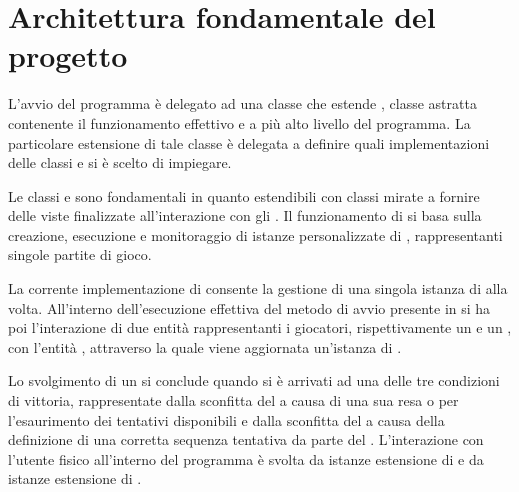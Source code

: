\documentclass[letterpaper,10pt,italian,openany,oneside]{sphinxmanual}
\begin{document}
\section{Architettura fondamentale del progetto}
\label{\detokenize{introduzione:architettura-fondamentale-del-progetto}}
L’avvio del programma è delegato ad una classe che estende , classe astratta contenente il funzionamento effettivo e a più alto livello del programma.
La particolare estensione di tale classe è delegata a definire quali implementazioni delle classi  e  si è scelto di impiegare.

Le classi  e  sono fondamentali in quanto estendibili con classi mirate a fornire delle viste finalizzate all’interazione con gli .
Il funzionamento di  si basa sulla creazione, esecuzione e monitoraggio di istanze personalizzate di , rappresentanti singole partite di gioco.

La corrente implementazione di  consente la gestione di una singola istanza di  alla volta.
All’interno dell’esecuzione effettiva del metodo di avvio presente in  si ha poi l’interazione di due entità rappresentanti i giocatori, rispettivamente
un   e un  ,
con l’entità , attraverso la quale viene aggiornata un’istanza di  .

Lo svolgimento di un  si conclude quando si è arrivati ad una delle tre condizioni di vittoria, rappresentate dalla sconfitta del  a causa di una sua resa
o per l’esaurimento dei tentativi disponibili e dalla sconfitta del  a causa della definizione di una corretta sequenza tentativa da parte del .
L’interazione con l’utente fisico all’interno del programma è svolta da istanze estensione di   e da
istanze estensione di  .
\end{document}
